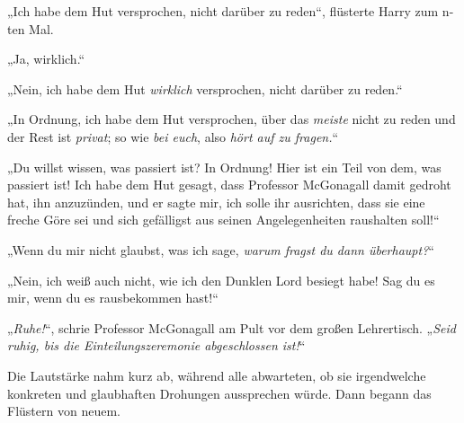 „Ich habe dem Hut versprochen, nicht darüber zu reden“, flüsterte Harry zum n-ten Mal.

„Ja, wirklich.“

„Nein, ich habe dem Hut \emph{wirklich} versprochen, nicht darüber zu reden.“

„In Ordnung, ich habe dem Hut versprochen, über das \emph{meiste} nicht zu reden und der Rest ist \emph{privat}; so wie \emph{bei euch}, also \emph{hört auf zu fragen.}“

„Du willst wissen, was passiert ist? In Ordnung! Hier ist ein Teil von dem, was passiert ist! Ich habe dem Hut gesagt, dass Professor McGonagall damit gedroht hat, ihn anzuzünden, und er sagte mir, ich solle ihr ausrichten, dass sie eine freche Göre sei und sich gefälligst aus seinen Angelegenheiten raushalten soll!“

„Wenn du mir nicht glaubst, was ich sage, \emph{warum fragst du dann überhaupt?}“

„Nein, ich weiß auch nicht, wie ich den Dunklen Lord besiegt habe! Sag du es mir, wenn du es rausbekommen hast!“

„\emph{Ruhe!}“, schrie Professor McGonagall am Pult vor dem großen Lehrertisch.
„\emph{Seid ruhig, bis die Einteilungszeremonie abgeschlossen ist!}“

Die Lautstärke nahm kurz ab, während alle abwarteten, ob sie irgendwelche konkreten und glaubhaften Drohungen aussprechen würde. Dann begann das Flüstern von neuem.

